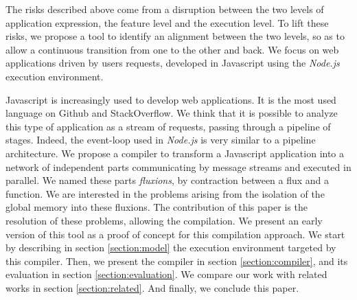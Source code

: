 The risks described above come from a disruption between the two levels of application expression, the feature level and the execution level.
To lift these risks, we propose a tool to identify an alignment between the two levels, so as to allow a continuous transition from one to the other and back.
We focus on web applications driven by users requests, developed in Javascript using the \textit{Node.js} execution environment.

Javascript is increasingly used to develop web applications.
It is the most used language on Github and StackOverflow.
We think that it is possible to analyze this type of application as a stream of requests, passing through a pipeline of stages.
Indeed, the event-loop used in \textit{Node.js} is very similar to a pipeline architecture.
We propose a compiler to transform a Javascript application into a network of independent parts communicating by message streams and executed in parallel.
We named these parts \textit{fluxions}, by contraction between a flux and a function.
We are interested in the problems arising from the isolation of the global memory into these fluxions.
The contribution of this paper is the resolution of these problems, allowing the compilation.
We present an early version of this tool as a proof of concept for this compilation approach.
We start by describing in section \ref{section:model} the execution environment targeted by this compiler.
Then, we present the compiler in section \ref{section:compiler}, and its evaluation in section \ref{section:evaluation}.
We compare our work with related works in section \ref{section:related}.
And finally, we conclude this paper.